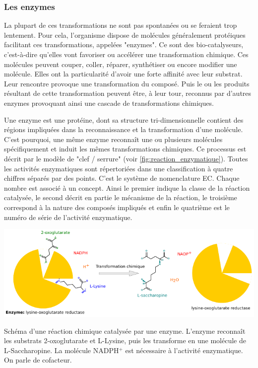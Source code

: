 \begin{refsegment}
    
    \subsubsection{Les enzymes}    
    La plupart de ces transformations ne sont pas spontanées ou se feraient trop lentement. Pour cela, l'organisme dispose de molécules généralement protéiques facilitant ces transformations, appelées "enzymes". Ce sont des bio-catalyseurs, c'est-à-dire qu'elles vont favoriser ou accélérer une transformation chimique. Ces molécules peuvent couper, coller, réparer, synthétiser ou encore modifier une molécule. Elles ont la particularité d'avoir une forte affinité avec leur substrat.  Leur rencontre provoque une transformation du composé. Puis le ou les produits résultant de cette transformation peuvent être, à leur tour, reconnus par d'autres enzymes provoquant ainsi une cascade de transformations chimiques. 
    
    Une enzyme est une protéine, dont sa structure tri-dimensionnelle contient des régions impliquées dans la reconnaissance et la transformation d’une molécule. C'est pourquoi, une même enzyme reconnaît une ou plusieurs molécules spécifiquement et induit les mêmes transformations chimiques. Ce processus est décrit par le modèle de "clef / serrure" (voir \cref{fig:reaction_enzymatique}). Toutes les activités enzymatiques sont répertoriées dans une classification à quatre chiffres séparés par des points. C'est le système de nomenclature \acrfull{EC}. Chaque nombre est associé à un concept. Ainsi le premier indique la classe de la réaction catalysée, le second décrit en partie le mécanisme de la réaction, le troisième correspond à la nature des composés impliqués et enfin le quatrième est le numéro de série de l'activité enzymatique.
    
    \begin{shadedfigure}[H]
        \centering
        \includegraphics[width=\textwidth]{img/lysine-oxoglutarate_reductase.pdf}
        \caption{Schéma d'une réaction chimique catalysée par une enzyme. L'enzyme reconnaît les substrats 2-oxoglutarate et L-Lysine, puis les transforme en une molécule de L-Saccharopine. La molécule NADPH$^{+}$ est nécessaire à l'activité enzymatique. On parle de cofacteur.}
        \label{fig:reaction_enzymatique}
    \end{shadedfigure}
    

\end{refsegment}
